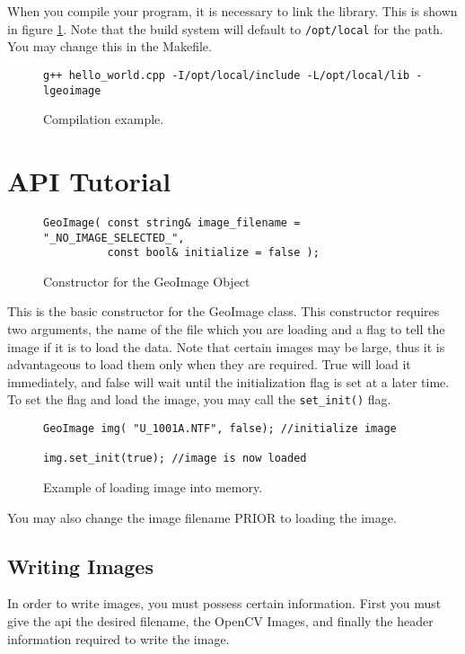 \documentclass[10pt]{report}
\begin{document}
When you compile your program, it is necessary to link the library. This
is shown in figure \ref{fig:basic02}.  Note that the build system will 
default to \texttt{/opt/local} for the path.  You may change this in the Makefile.


\begin{figure}[!h]
\begin{verbatim}
g++ hello_world.cpp -I/opt/local/include -L/opt/local/lib -lgeoimage
\end{verbatim}
\caption{Compilation example.}
\label{fig:basic02}
\end{figure}



\section*{API Tutorial}

\begin{figure}[!h]
\begin{lstlisting}
GeoImage( const string& image_filename = "_NO_IMAGE_SELECTED_", 
          const bool& initialize = false );
\end{lstlisting}
\caption{Constructor for the GeoImage Object}
\label{fig:geoimage01}
\end{figure}

This is the basic constructor for the GeoImage class.  This constructor requires two arguments, 
the name of the file which you are loading and a flag to tell the image if it is to load the
data.  Note that certain images may be large, thus it is advantageous to load them only when they 
are required.  True will load it immediately, and false will wait until the initialization flag
is set at a later time. To set the flag and load the image, you may call the \texttt{set\_init()}
flag. 

\begin{figure}[!h]
\begin{lstlisting}
GeoImage img( "U_1001A.NTF", false); //initialize image

img.set_init(true); //image is now loaded
\end{lstlisting}
\caption{Example of loading image into memory.}
\label{fig:geoimage02}
\end{figure}

You may also change the image filename PRIOR to loading the image. 

\subsection*{Writing Images}
In order to write images, you must possess certain information.  First you must 
give the api the desired filename, the OpenCV Images, and finally the header information
required to write the image.
\end{document}
